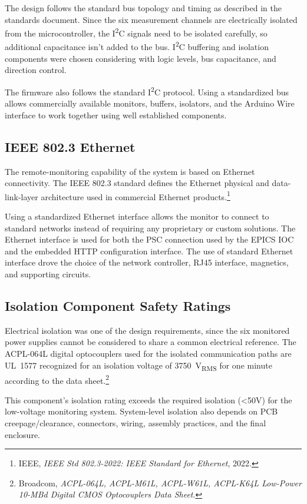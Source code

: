 The design follows the standard bus topology and timing as described in the standards document. Since the six measurement channels are electrically isolated from the microcontroller, the I\textsuperscript{2}C
signals need to be isolated carefully, so additional capacitance isn't added to the bus. I\textsuperscript{2}C buffering and isolation
components were chosen considering with logic levels, bus
capacitance, and direction control.

The firmware also follows the standard I\textsuperscript{2}C protocol. Using a standardized bus allows commercially available monitors, buffers, isolators, and the Arduino Wire interface to work together using well established components.


\subsection{IEEE 802.3 Ethernet}

The remote-monitoring capability of the system is based on Ethernet connectivity. The IEEE 802.3 standard defines the Ethernet physical and data-link-layer architecture used in
commercial Ethernet products.\footnote{IEEE, \textit{IEEE Std 802.3-2022:
        IEEE Standard for Ethernet}, 2022.}

Using a standardized Ethernet interface allows the monitor to connect to standard networks instead of requiring any proprietary or custom solutions. The Ethernet interface is used for both the PSC connection used by the EPICS IOC and the embedded HTTP configuration interface. The use of standard Ethernet interface drove the choice of the network
controller, RJ45 interface, magnetics, and supporting circuits.

\subsection{Isolation Component Safety Ratings}

Electrical isolation was one of the design requirements, since the six monitored
power supplies cannot be considered to share a common electrical reference. The
ACPL-064L digital optocouplers used for the isolated communication paths are
UL~1577 recognized for an isolation voltage of 3750~V\textsubscript{RMS} for one
minute according to the data sheet.\footnote{Broadcom,
    \textit{ACPL-064L, ACPL-M61L, ACPL-W61L, ACPL-K64L Low-Power 10-MBd Digital CMOS
        Optocouplers Data Sheet}.}

This component's isolation rating exceeds the required isolation (<50V) for the low-voltage monitoring system. System-level isolation also depends on PCB creepage/clearance, connectors, wiring, assembly practices, and the final enclosure.

